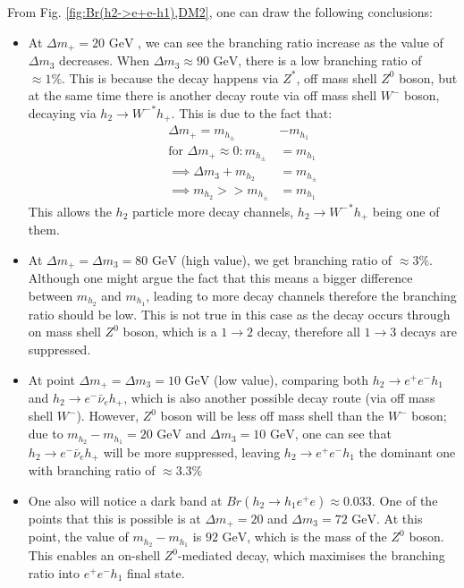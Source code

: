 \documentclass[12pt]{article}
\begin{document}
From Fig. \ref{fig:Br(h2->e+e-h1),DM2}, one can draw the following conclusions:
\begin{itemize}
    \item At $\Delta m_+= 20\text{ GeV}$ , we can see the branching ratio increase as the value of $\Delta m_3$ decreases. When $\Delta m_3 \approx 90 \text{ GeV}$, there is a low branching ratio of $\approx 1\%$. This is because the decay happens via ${Z}^*$, off mass shell $Z^0$ boson, but at the same time there is another decay route via off mass shell $W^-$ boson, decaying via $h_2 \rightarrow {W^-}^*h_+$. This is due to the fact that:
    \begin{equation}
        \begin{split}
            \Delta m_+ = m_{h_\pm} &- m_{h_1}
            \\ \text{for }\Delta m_+ \approx 0: m_{h_\pm} &= m_{h_1}
            \\ \implies \Delta m_3 + m_{h_2} &= m_{h_\pm}
            \\\implies m_{h_2} >> m_{h_\pm} &= m_{h_1}
        \end{split}
    \end{equation}
    This allows the $h_2$ particle more decay channels, $h_2 \rightarrow {W^-}^*h_+$ being one of them.
    \item At $\Delta m_+= \Delta m_3=80 \text{ GeV}$ (high value), we get branching ratio of $\approx 3\%$. Although one might argue the fact that this means a bigger difference between $m_{h_2}$ and $m_{h_1}$, leading to more decay channels therefore the branching ratio should be low. This is not true in this case as the decay occurs through on mass shell $Z^0$ boson, which is a $1\rightarrow2$ decay, therefore all $1\rightarrow3$ decays are suppressed.
    \item At point $\Delta m_+=\Delta m_3=10 \text{ GeV}$ (low value), comparing both $h_2 \rightarrow e^+ e^- h_1$ and $h_2 \rightarrow e^- \bar{\nu}_e h_+$, which is also another possible decay route (via off mass shell $W^-$). However, $Z^0$ boson will be less off mass shell than the $W^-$ boson; due to $m_{h_2} - m_{h_1} = 20 \text{ GeV}$ and $\Delta m_3= 10 \text{ GeV}$, one can see that $h_2 \rightarrow e^- \bar{\nu}_e h_+$ will be more suppressed, leaving $h_2 \rightarrow e^+ e^- h_1$ the dominant one with branching ratio of $\approx 3.3\%$
    \item One also will notice a dark band at $Br(h_2 \rightarrow h_1 e^+e) \approx 0.033$. One of the points that this is possible is at $\Delta m_+= 20$ and $\Delta m_3=72 \text{ GeV}$. At this point, the value of $m_{h_2} - m_{h_1}$ is $ 92 \text{ GeV}$, which is the mass of the $Z^0$ boson. This enables an on-shell $Z^0$-mediated decay, which maximises the branching ratio into $e^+ e^- h_1$ final state.
\end{itemize}
\end{document}
